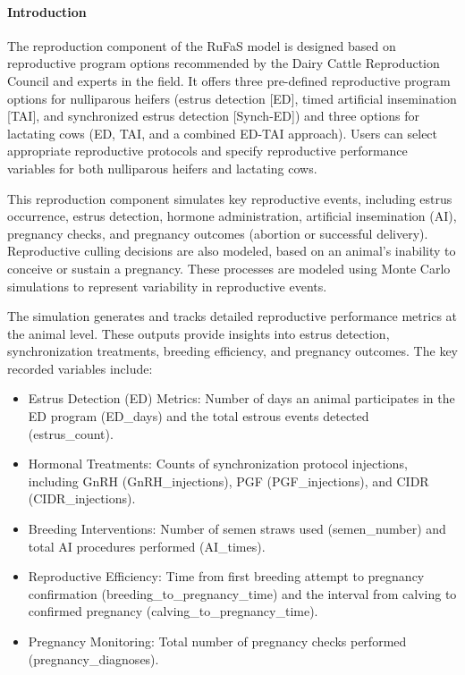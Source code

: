 \begin{refsection}
    \paragraph{Introduction} The reproduction component of the RuFaS model is designed based on reproductive program options recommended by the Dairy Cattle Reproduction Council \parencite{dcrc_protocols} and experts in the field. It offers three pre-defined reproductive program options for nulliparous heifers (estrus detection [ED], timed artificial insemination [TAI], and synchronized estrus detection [Synch-ED]) and three options for lactating cows (ED, TAI, and a combined ED-TAI approach). Users can select appropriate reproductive protocols and specify reproductive performance variables for both nulliparous heifers and lactating cows.
    
    \vspace{0.20cm}This reproduction component simulates key reproductive events, including estrus occurrence, estrus detection, hormone administration, artificial insemination (AI), pregnancy checks, and pregnancy outcomes (abortion or successful delivery). Reproductive culling decisions are also modeled, based on an animal's inability to conceive or sustain a pregnancy. These processes are modeled using Monte Carlo simulations to represent variability in reproductive events.

    \vspace{0.2cm}The simulation generates and tracks detailed reproductive performance metrics at the animal level. These outputs provide insights into estrus detection, synchronization treatments, breeding efficiency, and pregnancy outcomes. The key recorded variables include:
    \begin{itemize}
        \item Estrus Detection (ED) Metrics: Number of days an animal participates in the ED program (ED\_days) and the total estrous events detected (estrus\_count).
        \item Hormonal Treatments: Counts of synchronization protocol injections, including GnRH (GnRH\_injections), PGF (PGF\_injections), and CIDR (CIDR\_injections).
        \item Breeding Interventions: Number of semen straws used (semen\_number) and total AI procedures performed (AI\_times).
        \item Reproductive Efficiency: Time from first breeding attempt to pregnancy confirmation (breeding\_to\_pregnancy\_time) and the interval from calving to confirmed pregnancy (calving\_to\_pregnancy\_time).
        \item Pregnancy Monitoring: Total number of pregnancy checks performed (pregnancy\_diagnoses).
    \end{itemize}


\end{refsection}
